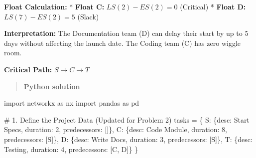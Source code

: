 \documentclass[
  letterpaper,
  DIV=11,
  numbers=noendperiod]{scrreprt}
\newenvironment{Shaded}{\begin{snugshade}}{\end{snugshade}}
\newcommand{\CommentTok}[1]{\textcolor[rgb]{0.37,0.37,0.37}{#1}}
\newcommand{\DecValTok}[1]{\textcolor[rgb]{0.68,0.00,0.00}{#1}}
\newcommand{\ImportTok}[1]{\textcolor[rgb]{0.00,0.46,0.62}{#1}}
\newcommand{\NormalTok}[1]{\textcolor[rgb]{0.00,0.23,0.31}{#1}}
\newcommand{\OperatorTok}[1]{\textcolor[rgb]{0.37,0.37,0.37}{#1}}
\newcommand{\StringTok}[1]{\textcolor[rgb]{0.13,0.47,0.30}{#1}}
\begin{document}
\textbf{Float Calculation:} * \textbf{Float C:} \(LS(2) - ES(2) = 0\)
(Critical) * \textbf{Float D:} \(LS(7) - ES(2) = 5\) (Slack)

\textbf{Interpretation:} The Documentation team (D) can delay their
start by up to 5 days without affecting the launch date. The Coding team
(C) has zero wiggle room.

\textbf{Critical Path:} \(S \to C \to T\)

\begin{quote}
\textbf{Python solution}
\end{quote}

\begin{Shaded}
\begin{Highlighting}[]
\ImportTok{import}\NormalTok{ networkx }\ImportTok{as}\NormalTok{ nx}
\ImportTok{import}\NormalTok{ pandas }\ImportTok{as}\NormalTok{ pd}

\CommentTok{\# 1. Define the Project Data (Updated for Problem 2)}
\NormalTok{tasks }\OperatorTok{=}\NormalTok{ \{}
    \StringTok{\textquotesingle{}S\textquotesingle{}}\NormalTok{: \{}\StringTok{\textquotesingle{}desc\textquotesingle{}}\NormalTok{: }\StringTok{\textquotesingle{}Start Specs\textquotesingle{}}\NormalTok{, }\StringTok{\textquotesingle{}duration\textquotesingle{}}\NormalTok{: }\DecValTok{2}\NormalTok{, }\StringTok{\textquotesingle{}predecessors\textquotesingle{}}\NormalTok{: []\},}
    \StringTok{\textquotesingle{}C\textquotesingle{}}\NormalTok{: \{}\StringTok{\textquotesingle{}desc\textquotesingle{}}\NormalTok{: }\StringTok{\textquotesingle{}Code Module\textquotesingle{}}\NormalTok{, }\StringTok{\textquotesingle{}duration\textquotesingle{}}\NormalTok{: }\DecValTok{8}\NormalTok{, }\StringTok{\textquotesingle{}predecessors\textquotesingle{}}\NormalTok{: [}\StringTok{\textquotesingle{}S\textquotesingle{}}\NormalTok{]\},}
    \StringTok{\textquotesingle{}D\textquotesingle{}}\NormalTok{: \{}\StringTok{\textquotesingle{}desc\textquotesingle{}}\NormalTok{: }\StringTok{\textquotesingle{}Write Docs\textquotesingle{}}\NormalTok{,  }\StringTok{\textquotesingle{}duration\textquotesingle{}}\NormalTok{: }\DecValTok{3}\NormalTok{, }\StringTok{\textquotesingle{}predecessors\textquotesingle{}}\NormalTok{: [}\StringTok{\textquotesingle{}S\textquotesingle{}}\NormalTok{]\},}
    \StringTok{\textquotesingle{}T\textquotesingle{}}\NormalTok{: \{}\StringTok{\textquotesingle{}desc\textquotesingle{}}\NormalTok{: }\StringTok{\textquotesingle{}Testing\textquotesingle{}}\NormalTok{,     }\StringTok{\textquotesingle{}duration\textquotesingle{}}\NormalTok{: }\DecValTok{4}\NormalTok{, }\StringTok{\textquotesingle{}predecessors\textquotesingle{}}\NormalTok{: [}\StringTok{\textquotesingle{}C\textquotesingle{}}\NormalTok{, }\StringTok{\textquotesingle{}D\textquotesingle{}}\NormalTok{]\}}
\NormalTok{\}}


\end{Highlighting}
\end{Shaded}
\end{document}
